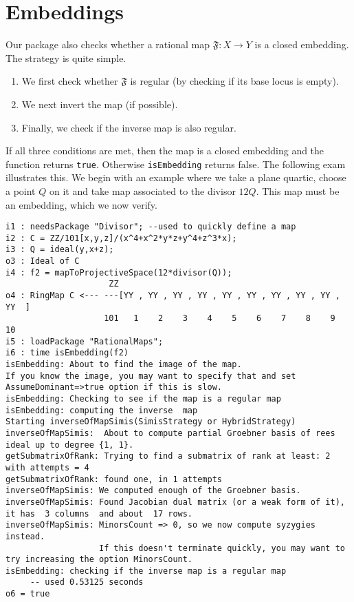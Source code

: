 \documentclass[11pt]{amsart}
\numberwithin{equation}{theorem}
\renewcommand{\:}{\colon}
\theoremstyle{theorem}
\begin{document}
{\color{black}\normalsize
\section{Embeddings}

Our package also checks whether a rational map $\mathfrak{F} : X \to Y$ is a closed embedding.  The strategy is quite simple.
\begin{enumerate}
\item  We first check whether $\mathfrak{F}$ is regular (by checking if its base locus is empty).
\item  We next invert the map (if possible).
\item  Finally, we check if the inverse map is also regular.
\end{enumerate}
If all three conditions are met, then the map is a closed embedding and the function returns {\tt true}.  Otherwise {\tt isEmbedding} returns false.
The following exam illustrates this.  We begin with an example where we take a plane quartic, choose a point $Q$ on it and take map associated to
the divisor $12 Q$.  This map must be an embedding, which we now verify.
}
{\scriptsize
\color{blue}\begin{verbatim}
i1 : needsPackage "Divisor"; --used to quickly define a map
i2 : C = ZZ/101[x,y,z]/(x^4+x^2*y*z+y^4+z^3*x);
i3 : Q = ideal(y,x+z);
o3 : Ideal of C
i4 : f2 = mapToProjectiveSpace(12*divisor(Q));
                     ZZ
o4 : RingMap C <--- ---[YY , YY , YY , YY , YY , YY , YY , YY , YY , YY  ]
                    101   1    2    3    4    5    6    7    8    9    10
i5 : loadPackage "RationalMaps";
i6 : time isEmbedding(f2)
isEmbedding: About to find the image of the map.
If you know the image, you may want to specify that and set AssumeDominant=>true option if this is slow.
isEmbedding: Checking to see if the map is a regular map
isEmbedding: computing the inverse  map
Starting inverseOfMapSimis(SimisStrategy or HybridStrategy)
inverseOfMapSimis:  About to compute partial Groebner basis of rees ideal up to degree {1, 1}.
getSubmatrixOfRank: Trying to find a submatrix of rank at least: 2 with attempts = 4
getSubmatrixOfRank: found one, in 1 attempts
inverseOfMapSimis: We computed enough of the Groebner basis.
inverseOfMapSimis: Found Jacobian dual matrix (or a weak form of it), it has  3 columns  and about  17 rows.
inverseOfMapSimis: MinorsCount => 0, so we now compute syzygies instead.
                   If this doesn't terminate quickly, you may want to try increasing the option MinorsCount.
isEmbedding: checking if the inverse map is a regular map
     -- used 0.53125 seconds
o6 = true
\end{verbatim}
}
\end{document}
